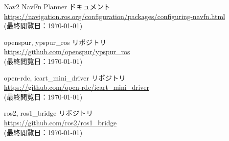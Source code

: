 \documentclass[twocolumn, 9pt]{jsproceedings}
\begin{document}
\begin{thebibliography}{99}
Nav2 NavFn Planner ドキュメント\\
\url{https://navigation.ros.org/configuration/packages/configuring-navfn.html}\\
(最終閲覧日：\today)

openspur, ypspur\_ros リポジトリ\\
\url{https://github.com/openspur/ypspur_ros}\\
(最終閲覧日：\today)

open-rdc, icart\_mini\_driver リポジトリ\\
\url{https://github.com/open-rdc/icart_mini_driver}\\
(最終閲覧日：\today)

ros2, ros1\_bridge リポジトリ\\
\url{https://github.com/ros2/ros1_bridge}\\
(最終閲覧日：\today)





\end{thebibliography}
\normalsize
\end{document}
